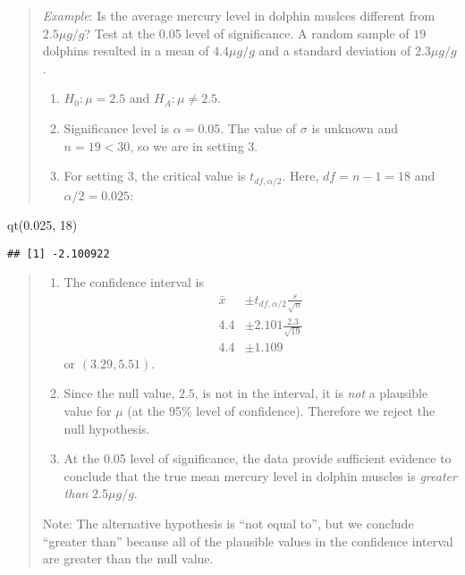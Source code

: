 \documentclass[
]{book}
\newenvironment{Shaded}{\begin{snugshade}}{\end{snugshade}}
\newcommand{\DecValTok}[1]{\textcolor[rgb]{0.00,0.00,0.81}{#1}}
\newcommand{\FloatTok}[1]{\textcolor[rgb]{0.00,0.00,0.81}{#1}}
\newcommand{\FunctionTok}[1]{\textcolor[rgb]{0.00,0.00,0.00}{#1}}
\newcommand{\NormalTok}[1]{#1}
\providecommand{\tightlist}{%
  \setlength{\itemsep}{0pt}\setlength{\parskip}{0pt}}
\begin{document}
\begin{quote}
\emph{Example}: Is the average mercury level in dolphin muslces different from \(2.5\mu g/g\)? Test at the 0.05 level of significance. A random sample of \(19\) dolphins resulted in a mean of \(4.4 \mu g/g\) and a standard deviation of \(2.3 \mu g/g\).

\begin{enumerate}
\def\labelenumi{\arabic{enumi}.}
\tightlist
\item
  \(H_0: \mu = 2.5\) and \(H_A: \mu \ne 2.5\).
\item
  Significance level is \(\alpha=0.05\). The value of \(\sigma\) is unknown and \(n = 19 < 30\), so we are in setting 3.
\item
  For setting 3, the critical value is \(t_{df, \alpha/2}\). Here, \(df=n-1=18\) and \(\alpha/2 = 0.025\):
\end{enumerate}
\end{quote}

\begin{Shaded}
\begin{Highlighting}[]
\FunctionTok{qt}\NormalTok{(}\FloatTok{0.025}\NormalTok{, }\DecValTok{18}\NormalTok{)}
\end{Highlighting}
\end{Shaded}

\begin{verbatim}
## [1] -2.100922
\end{verbatim}

\begin{quote}
\begin{enumerate}
\def\labelenumi{\arabic{enumi}.}
\setcounter{enumi}{3}
\tightlist
\item
  The confidence interval is \begin{align} \bar{x} &\pm t_{df, \alpha/2}\frac{s}{\sqrt{n}} \\ 4.4 &\pm 2.101 \frac{2.3}{\sqrt{19}} \\ 4.4 &\pm 1.109 \end{align} or \((3.29, 5.51)\).
\item
  Since the null value, \(2.5\), is not in the interval, it is \emph{not} a plausible value for \(\mu\) (at the 95\% level of confidence). Therefore we reject the null hypothesis.
\item
  At the 0.05 level of significance, the data provide sufficient evidence to conclude that the true mean mercury level in dolphin muscles is \emph{greater than} \(2.5\mu g/g\).
\end{enumerate}

Note: The alternative hypothesis is ``not equal to'', but we conclude ``greater than'' because all of the plausible values in the confidence interval are greater than the null value.
\end{quote}
\end{document}

